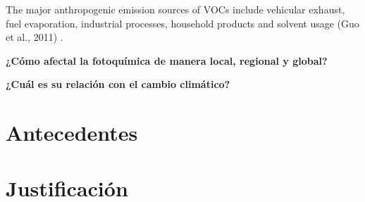 \documentclass[10pt]{article}
\begin{document}
The major anthropogenic emission sources of VOCs include vehicular exhaust, fuel evaporation, industrial processes, household products and solvent usage (Guo et al., 2011) \cite{Guo2017}.

\bf{¿Cómo afectal la fotoquímica de manera local, regional y global?}

\bf{¿Cuál es su relación con el cambio climático?}

\section{Antecedentes}\label{sec:2}


\section{Justificación}\label{sec:3}



\end{document}
